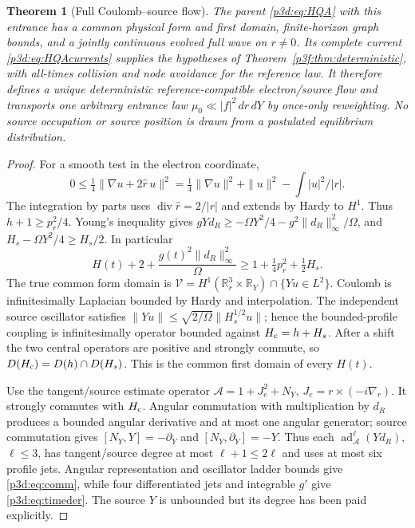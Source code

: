 \documentclass[11pt]{article}
\numberwithin{equation}{section}
\newtheorem{theorem}{Theorem}[section]
\theoremstyle{definition}
\theoremstyle{remark}
\begin{document}
\begin{theorem}[Full Coulomb--source flow]\label{p3d:thm:HQA}
The parent \eqref{p3d:eq:HQA} with this entrance has a common physical
form and first domain, finite-horizon graph bounds, and a jointly
continuous evolved full wave on $r\neq0$. Its complete current
\eqref{p3d:eq:HQAcurrents} supplies the hypotheses of
Theorem~\ref{p3f:thm:deterministic}, with all-times collision and
node avoidance for the reference law. It therefore defines a unique
deterministic reference-compatible electron/source flow and transports
one arbitrary entrance law $\mu_0\ll|f|^2\,dr\,dY$ by once-only
reweighting. No source occupation or source position is drawn from a
postulated equilibrium distribution.
\end{theorem}
\begin{proof}
For a smooth test in the electron coordinate,
\[
 0\leq\tfrac14\|\nabla u+2\widehat r\,u\|^2
 =\tfrac14\|\nabla u\|^2+\|u\|^2-\int |u|^2/|r|.
\]
The integration by parts uses
$\operatorname{div}\widehat r=2/|r|$ and extends by Hardy to $H^1$.
Thus $h+1\geq p_r^2/4$. Young's inequality gives
$gYd_R\geq-\Omega Y^2/4-g^2\|d_R\|_\infty^2/\Omega$,
and $H_s-\Omega Y^2/4\geq H_s/2$. In particular
\begin{equation}\label{p3d:eq:HQAcoercivity}
 H(t)+2+\frac{g(t)^2\|d_R\|_\infty^2}{\Omega}
 \geq1+\tfrac14p_r^2+\tfrac12H_s .
\end{equation}
The true common form domain is
$\mathcal V=H^1(\mathbb R^3_r\times\mathbb R_Y)
\cap\{Yu\in L^2\}$.
Coulomb is infinitesimally Laplacian bounded by Hardy and
interpolation. The independent source oscillator satisfies
$\|Yu\|\leq\sqrt{2/\Omega}\|H_s^{1/2}u\|$; hence the bounded-profile
coupling is infinitesimally operator bounded against
$H_{\rm c}=h+H_s$. After a shift the two central operators are positive
and strongly commute, so
$D(H_{\rm c})=D(h)\cap D(H_s)$.
This is the common first domain of every $H(t)$.

Use the tangent/source estimate operator
$\mathcal A=1+J_e^2+N_Y$, $J_e=r\times(-i\nabla_r)$.
It strongly commutes with $H_{\rm c}$.
Angular commutation with multiplication by $d_R$ produces a bounded
angular derivative and at most one angular generator; source
commutation gives $[N_Y,Y]=-\partial_Y$ and
$[N_Y,\partial_Y]=-Y$. Thus each
$\operatorname{ad}_{\mathcal A}^{\ell}(Yd_R)$, $\ell\leq3$,
has tangent/source degree at most $\ell+1\leq2\ell$ and uses at most
six profile jets. Angular representation and oscillator ladder bounds
give \eqref{p3d:eq:comm}, while four differentiated jets and integrable
$g'$ give \eqref{p3d:eq:timeder}. The source $Y$ is unbounded but its
degree has been paid explicitly.


\end{proof}
\end{document}
